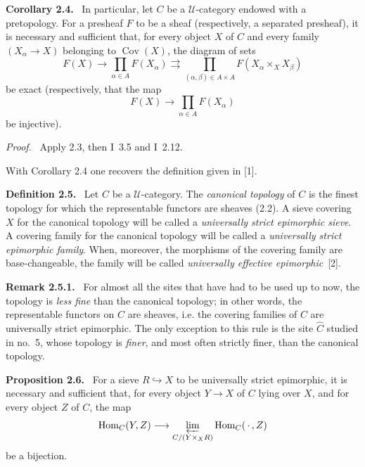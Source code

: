 \documentclass[11pt]{article}
\newcommand{\U}{\mathcal{U}}
\newcommand{\Hom}{\operatorname{Hom}}
\newcommand{\Cov}{\operatorname{Cov}}
\newenvironment{statement}[1]{\par\medskip\noindent\textbf{#1.}\ }{\par\medskip}
\newenvironment{remarktext}[1]{\par\medskip\noindent\textbf{#1.}\ }{\par\medskip}
\newenvironment{prooftext}{\par\noindent\emph{Proof.}\ }{\par\medskip}
\begin{document}
\begin{statement}{Corollary 2.4}
In particular, let \(C\) be a \(\U\)-category endowed with a pretopology. For a presheaf \(F\) to be a sheaf (respectively, a separated presheaf), it is necessary and sufficient that, for every object \(X\) of \(C\) and every family \((X_\alpha\to X)\) belonging to \(\Cov(X)\), the diagram of sets
\[
F(X)\longrightarrow \prod_{\alpha\in A}F(X_\alpha)\rightrightarrows
\prod_{(\alpha,\beta)\in A\times A}F(X_\alpha\times_XX_\beta)
\]
be exact (respectively, that the map
\[
F(X)\longrightarrow \prod_{\alpha\in A}F(X_\alpha)
\]
be injective).
\end{statement}

\begin{prooftext}
Apply 2.3, then I~3.5 and I~2.12.

With Corollary 2.4 one recovers the definition given in [1].
\end{prooftext}

\begin{statement}{Definition 2.5}
Let \(C\) be a \(\U\)-category. The \emph{canonical topology} of \(C\) is the finest topology for which the representable functors are sheaves (2.2). A sieve covering \(X\) for the canonical topology will be called a \emph{universally strict epimorphic sieve}. A covering family for the canonical topology will be called a \emph{universally strict epimorphic family}. When, moreover, the morphisms of the covering family are base-changeable, the family will be called \emph{universally effective epimorphic}~[2].
\end{statement}

\begin{remarktext}{Remark 2.5.1}
For almost all the sites that have had to be used up to now, the topology is \emph{less fine} than the canonical topology; in other words, the representable functors on \(C\) are sheaves, i.e. the covering families of \(C\) are universally strict epimorphic. The only exception to this rule is the site \(\widehat{C}\) studied in no.~5, whose topology is \emph{finer}, and most often strictly finer, than the canonical topology.
\end{remarktext}

\begin{statement}{Proposition 2.6}
For a sieve \(R\hookrightarrow X\) to be universally strict epimorphic, it is necessary and sufficient that, for every object \(Y\to X\) of \(C\) lying over \(X\), and for every object \(Z\) of \(C\), the map
\[
\Hom_C(Y,Z)\longrightarrow \varprojlim_{C/(Y\times_XR)}\Hom_C(\,\cdot\,,Z)
\]
be a bijection.
\end{statement}
\end{document}
